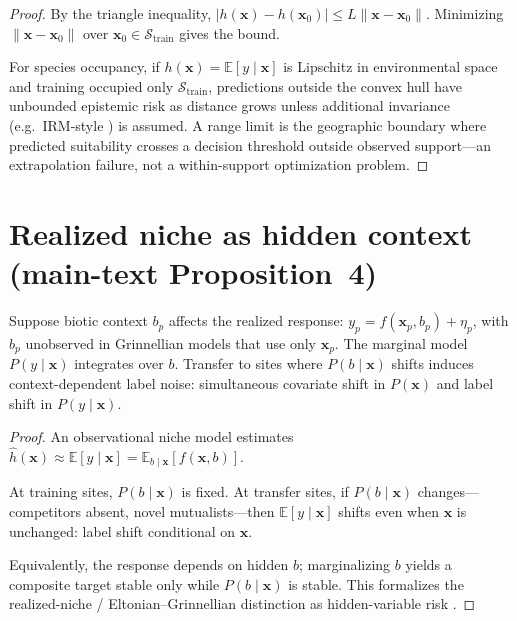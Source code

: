 \documentclass[11pt]{article}
\begin{document}
\begin{proof}
By the triangle inequality,
$|h(\mathbf{x})-h(\mathbf{x}_0)|\le L\|\mathbf{x}-\mathbf{x}_0\|$.
Minimizing $\|\mathbf{x}-\mathbf{x}_0\|$ over
$\mathbf{x}_0\in\mathcal{S}_{\mathrm{train}}$ gives the bound.

For species occupancy, if $h(\mathbf{x})=\mathbb{E}[y\mid\mathbf{x}]$ is
Lipschitz in environmental space and training occupied only
$\mathcal{S}_{\mathrm{train}}$, predictions outside the convex hull have
unbounded epistemic risk as distance grows unless additional invariance
(e.g.\ IRM-style \citep{arjovsky2019}) is assumed.  A range limit is the
geographic boundary where predicted suitability crosses a decision
threshold outside observed support---an extrapolation failure, not a
within-support optimization problem.
\end{proof}

\section{Realized niche as hidden context (main-text Proposition~4)}
\label{sec:thm5}

\begin{theorem}
\label{thm:esm-hidden-context}
Suppose biotic context $b_p$ affects the realized response:
$y_p = f(\mathbf{x}_p,b_p)+\eta_p$, with $b_p$ unobserved in Grinnellian
models that use only $\mathbf{x}_p$.  The marginal model $P(y\mid\mathbf{x})$
integrates over $b$.  Transfer to sites where $P(b\mid\mathbf{x})$ shifts
induces context-dependent label noise: simultaneous covariate shift in
$P(\mathbf{x})$ and label shift in $P(y\mid\mathbf{x})$.
\end{theorem}

\begin{proof}
An observational niche model estimates
$\hat{h}(\mathbf{x})\approx\mathbb{E}[y\mid\mathbf{x}]
=\mathbb{E}_{b\mid\mathbf{x}}[f(\mathbf{x},b)]$.

At training sites, $P(b\mid\mathbf{x})$ is fixed.  At transfer sites, if
$P(b\mid\mathbf{x})$ changes---competitors absent, novel mutualists---then
$\mathbb{E}[y\mid\mathbf{x}]$ shifts even when $\mathbf{x}$ is unchanged:
label shift conditional on $\mathbf{x}$.

Equivalently, the response depends on hidden $b$; marginalizing $b$ yields
a composite target stable only while $P(b\mid\mathbf{x})$ is stable.  This
formalizes the realized-niche / Eltonian--Grinnellian distinction as
hidden-variable risk \citep{soberon2007,koh2021}.
\end{proof}
\end{document}
